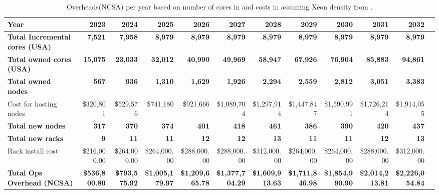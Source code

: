 \tiny \begin{longtable} { |p{}  |r  |r  |r  |r  |r  |r  |r  |r  |r  |r  |r |} 
\caption{Overheads(NCSA) per year based on number of cores in  and costs in  assuming Xeon density from .  \label{tab:opsOverheadCost}}\\ 
\hline 
\textbf{Year}&\textbf{2023}&\textbf{2024}&\textbf{2025}&\textbf{2026}&\textbf{2027}&\textbf{2028}&\textbf{2029}&\textbf{2030}&\textbf{2031}&\textbf{2032} \\ \hline
\textbf{Total Incremental cores (USA)}&\textbf{7,521}&\textbf{7,958}&\textbf{8,979}&\textbf{8,979}&\textbf{8,979}&\textbf{8,979}&\textbf{8,979}&\textbf{8,979}&\textbf{8,979}&\textbf{8,979} \\ \hline
\textbf{Total owned cores (USA)}&\textbf{15,075}&\textbf{23,033}&\textbf{32,012}&\textbf{40,990}&\textbf{49,969}&\textbf{58,947}&\textbf{67,926}&\textbf{76,904}&\textbf{85,883}&\textbf{94,861} \\ \hline
\textbf{Total owned nodes}&\textbf{567}&\textbf{936}&\textbf{1,310}&\textbf{1,629}&\textbf{1,926}&\textbf{2,294}&\textbf{2,559}&\textbf{2,812}&\textbf{3,051}&\textbf{3,383} \\ \hline
{Cost for hosting nodes}&{\$320,801}&{\$529,576}&{\$741,180}&{\$921,666}&{\$1,089,704}&{\$1,297,914}&{\$1,447,847}&{\$1,590,991}&{\$1,726,214}&{\$1,914,055} \\ \hline
\textbf{Total new nodes}&\textbf{317}&\textbf{370}&\textbf{374}&\textbf{401}&\textbf{418}&\textbf{461}&\textbf{386}&\textbf{390}&\textbf{420}&\textbf{437} \\ \hline
\textbf{Total new racks}&\textbf{9}&\textbf{11}&\textbf{11}&\textbf{12}&\textbf{12}&\textbf{13}&\textbf{11}&\textbf{11}&\textbf{12}&\textbf{13} \\ \hline
{Rack install cost }&{\$216,000.00}&{\$264,000.00}&{\$264,000.00}&{\$288,000.00}&{\$288,000.00}&{\$312,000.00}&{\$264,000.00}&{\$264,000.00}&{\$288,000.00}&{\$312,000.00} \\ \hline
\textbf{Total Ops Overhead (NCSA)}&\textbf{\$536,800.80}&\textbf{\$793,575.92}&\textbf{\$1,005,179.97}&\textbf{\$1,209,665.78}&\textbf{\$1,377,704.29}&\textbf{\$1,609,913.63}&\textbf{\$1,711,846.98}&\textbf{\$1,854,990.90}&\textbf{\$2,014,213.81}&\textbf{\$2,226,054.84} \\ \hline
\end{longtable} \normalsize
